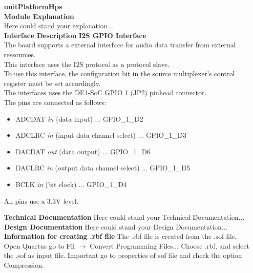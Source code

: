 \documentclass[../../../../doc/ASP-SoC_doc/main.tex]{subfiles}
\begin{document}
\textbf{unitPlatformHps}
\\

\textbf{Module Explanation}
\\
	Here could stand your explanation...\\
\textbf{Interface Description}
\textbf{I2S GPIO Interface}
\\
	The board supports a external interface for audio data transfer from external ressources. \\
	This interface uses the I2S protocol as a protocol slave.\\
	To use this interface, the configuration bit in the source multiplexer's control register must be set accordingly.\\
	The interfaces uses the DE1-SoC GPIO 1 (JP2) pinhead connector. \\
	The pins are connected as follows:
	\begin{itemize}
		\item ADCDAT \textit{in} (data input) ... GPIO\_1\_D2
		\item ADCLRC \textit{in} (input data channel select) ... GPIO\_1\_D3
		\item DACDAT \textit{out} (data output) ... GPIO\_1\_D6
		\item DACLRC \textit{in} (output data channel select) ... GPIO\_1\_D5
		\item BCLK   \textit{in} (bit clock) ... GPIO\_1\_D4
	\end{itemize}
	All pins use a 3.3V level.

\textbf{Technical Documentation}
	Here could stand your Technical Documentation...\\

\textbf{Design Documentation}
	Here could stand your Design Documentation...\\
	
\textbf{Information for creating .rbf file}
	The .rbf file is created from the .sof file. Open Quartus go to Fil $\rightarrow$ Convert Programming Files... Choose .rbf, and select the .sof as input file. Important go to properties of sof file and check the option Compression.
\end{document}
